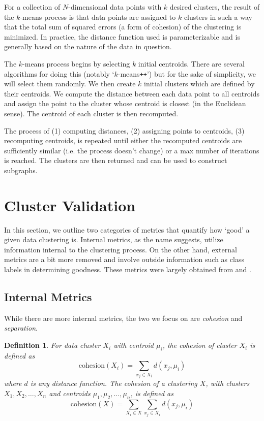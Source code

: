 \documentclass[11pt, letterpaper]{article}
\theoremstyle{perchance}
\newtheorem*{definition}{Definition}
\begin{document}
        For a collection of $N$-dimensional data points with $k$ desired clusters, the result of the $k$-means process is that data points are assigned to $k$ clusters in such a way that the total sum of squared errors (a form of cohesion) of the clustering is minimized. In practice, the distance function used is parameterizable and is generally based on the nature of the data in question.
        
        The $k$-means process begins by selecting $k$ initial centroids. There are several algorithms for doing this (notably `$k$-means\texttt{++}') but for the sake of simplicity, we will select them randomly. We then create $k$ initial clusters which are defined by their centroids. We compute the distance between each data point to all centroids and assign the point to the cluster whose centroid is closest (in the Euclidean sense). The centroid of each cluster is then recomputed. 
        
        The process of (1) computing distances, (2) assigning points to centroids, (3) recomputing centroids, is repeated until either the recomputed centroids are sufficiently similar (i.e. the process doesn't change) or a max number of iterations is reached. The clusters are then returned and can be used to construct subgraphs.

\section{Cluster Validation}\label{sec:valid}

    In this section, we outline two categories of metrics that quantify how `good' a given data clustering is. Internal metrics, as the name suggests, utilize information internal to the clustering process. On the other hand, external metrics are a bit more removed and involve outside information such as class labels in determining goodness. These metrics were largely obtained from \parencite[\S 23]{bennett} and \cite{cluster}.

    \subsection{Internal Metrics}

        While there are more internal metrics, the two we focus on are \emph{cohesion} and \emph{separation}.
    
        \begin{definition}
            For data cluster $X_i$ with centroid $\mu_i$, the \emph{cohesion} of cluster $X_i$ is defined as
            \[\text{cohesion}(X_i) = \sum_{x_j \in X_i} d(x_j, \mu_i)\]
            where $d$ is any distance function. The cohesion of a clustering $X$, with clusters $X_1, X_2, \ldots, X_n$ and centroids $\mu_1, \mu_2, \ldots, \mu_n$, is defined as 
            \[\text{cohesion}(X) = \sum_{X_i \in X} \sum_{x_j \in X_i} d(x_j, \mu_i)\]
        \end{definition}
    
\end{document}
